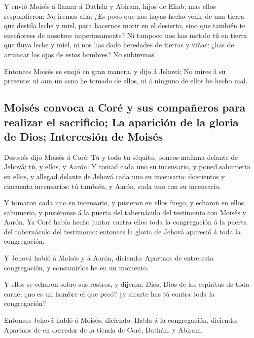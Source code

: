  Y envió Moisés á llamar á Dathán y Abiram, hijos de Eliab;
mas ellos respondieron: No iremos allá:  ¿Es poco que nos
hayas hecho venir de una tierra que destila leche y miel, para hacernos
morir en el desierto, sino que también te enseñorees de nosotros
imperiosamente?  Ni tampoco nos has metido tú en tierra que
fluya leche y miel, ni nos has dado heredades de tierras y viñas: ¿has
de arrancar los ojos de estos hombres? No subiremos.

 Entonces Moisés se enojó en gran manera, y dijo á Jehová:
No mires á su presente: ni aun un asno he tomado de ellos, ni á ninguno
de ellos he hecho mal.

\hypertarget{moisuxe9s-convoca-a-coruxe9-y-sus-compauxf1eros-para-realizar-el-sacrificio-la-apariciuxf3n-de-la-gloria-de-dios-intercesiuxf3n-de-moisuxe9s}{%
\subsection{Moisés convoca a Coré y sus compañeros para realizar el
sacrificio; La aparición de la gloria de Dios; Intercesión de
Moisés}\label{moisuxe9s-convoca-a-coruxe9-y-sus-compauxf1eros-para-realizar-el-sacrificio-la-apariciuxf3n-de-la-gloria-de-dios-intercesiuxf3n-de-moisuxe9s}}

 Después dijo Moisés á Coré: Tú y todo tu séquito, poneos
mañana delante de Jehová; tú, y ellos, y Aarón:  Y tomad
cada uno su incensario, y poned sahumerio en ellos, y allegad delante de
Jehová cada uno su incensario: doscientos y cincuenta incensarios: tú
también, y Aarón, cada uno con su incensario.

 Y tomaron cada uno su incensario, y pusieron en ellos
fuego, y echaron en ellos sahumerio, y pusiéronse á la puerta del
tabernáculo del testimonio con Moisés y Aarón.  Ya Coré
había hecho juntar contra ellos toda la congregación á la puerta del
tabernáculo del testimonio: entonces la gloria de Jehová apareció á toda
la congregación.

 Y Jehová habló á Moisés y á Aarón, diciendo: 
Apartaos de entre esta congregación, y consumirlos he en un momento.

 Y ellos se echaron sobre sus rostros, y dijeron: Dios,
Dios de los espíritus de toda carne, ¿no es un hombre el que pecó? ¿y
airarte has tú contra toda la congregación?

 Entonces Jehová habló á Moisés, diciendo: 
Habla á la congregación, diciendo: Apartaos de en derredor de la tienda
de Coré, Dathán, y Abiram.


